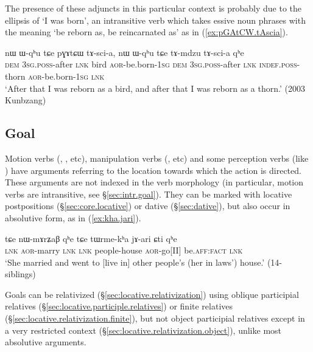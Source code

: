 The presence of these adjuncts in this particular context is probably due to the ellipsis of  `I was born', an intransitive verb which takes essive noun phrases with the meaning `be reborn as, be reincarnated as' as in (\ref{ex:pGAtCW.tAscia}).
 
 \begin{exe}
\ex \label{ex:pGAtCW.tAscia}
\gll  nɯ ɯ-qʰu tɕe pɣɤtɕɯ tɤ-sci-a, nɯ ɯ-qʰu tɕe tɤ-mdzu tɤ-sci-a qʰe \\
\textsc{dem} \textsc{3sg}.\textsc{poss}-after \textsc{lnk} bird \textsc{aor}-be.born-\textsc{1sg} \textsc{dem} \textsc{3sg}.\textsc{poss}-after \textsc{lnk} \textsc{indef}.\textsc{poss}-thorn \textsc{aor}-be.born-\textsc{1sg}  \textsc{lnk} \\
 \glt `After that I was reborn as a bird, and after that I was reborn as a thorn.' (2003 Kunbzang)
 \end{exe}

\subsection{Goal} \label{absolutive.goal}  
 
Motion verbs (, ,  etc), manipulation verbs (,  etc) and some perception verbs (like ) have arguments referring to the location towards which the action is directed. These arguments are not indexed in the verb morphology (in particular, motion verbs are intransitive, see §\ref{sec:intr.goal}). They can be marked with locative postpositions (§\ref{sec:core.locative}) or dative (§\ref{sec:dative}), but also occur in absolutive form, as  in (\ref{ex:kha.jari}).

\begin{exe}
\ex \label{ex:kha.jari}
 \gll tɕe nɯ-mɤrʑaβ qʰe tɕe tɯrme-kʰa jɤ-ari ɕti qʰe  \\
 \textsc{lnk} \textsc{aor}-marry \textsc{lnk}  \textsc{lnk} people-house \textsc{aor}-go[II] be.\textsc{aff}:\textsc{fact} \textsc{lnk} \\
\glt `She married and went to [live in] other people's (her in laws') house.' (14-siblings) 
\end{exe}

Goals can be relativized (§\ref{sec:locative.relativization}) using oblique participial relatives (§\ref{sec:locative.participle.relatives}) or finite relatives (§\ref{sec:locative.relativization.finite}), but not object participial relatives except in a very restricted context (§\ref{sec:locative.relativization.object}), unlike most absolutive arguments.

